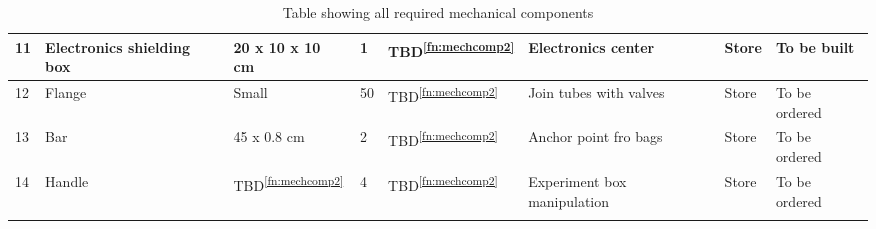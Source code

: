 \begin{longtable}{|m{}|m{}|m{}|m{}|m{}|m{}|m{}|m{}|}
11 & Electronics shielding box & 20 x 10 x 10 cm & 1 & TBD\textsuperscript{\ref{fn:mechcomp2}} & Electronics center & Store & To be built \\ \hline
12 & Flange & Small & 50 & TBD\textsuperscript{\ref{fn:mechcomp2}} & Join tubes with valves & Store & To be ordered \\ \hline
13 & Bar & 45 x 0.8 cm & 2 & TBD\textsuperscript{\ref{fn:mechcomp2}} & Anchor point fro bags & Store & To be ordered \\ \hline
14 & Handle & TBD\textsuperscript{\ref{fn:mechcomp2}} & 4 & TBD\textsuperscript{\ref{fn:mechcomp2}} & Experiment box manipulation & Store & To be ordered \\ \hline

    \caption{Table showing all required mechanical components}
    \label{tab:mechanical-components}
\end{longtable}
\raggedbottom